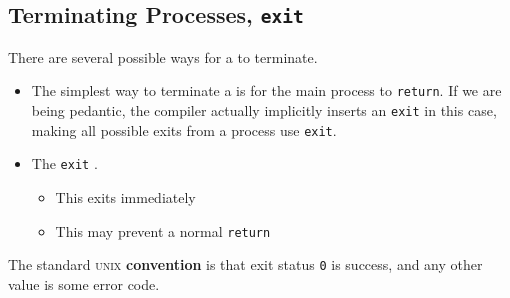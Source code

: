 \subsection{Terminating Processes, \texttt{exit}}\label{subsec:Terminating_Processes-exit}
There are several possible ways for a  to terminate.

\begin{itemize}[noitemsep]
\item The simplest way to terminate a  is for the main process to \texttt{return}.
  If we are being pedantic, the compiler actually implicitly inserts an \texttt{exit} in this case, making all possible exits from a process use \texttt{exit}.

\item The \texttt{exit} .
  \begin{itemize}[noitemsep]
  \item This exits immediately
  \item This may prevent a normal \texttt{return}
  \end{itemize}
\end{itemize}

The standard \textsc{unix} \textbf{convention} is that exit status \texttt{0} is success, and any other value is some error code.


